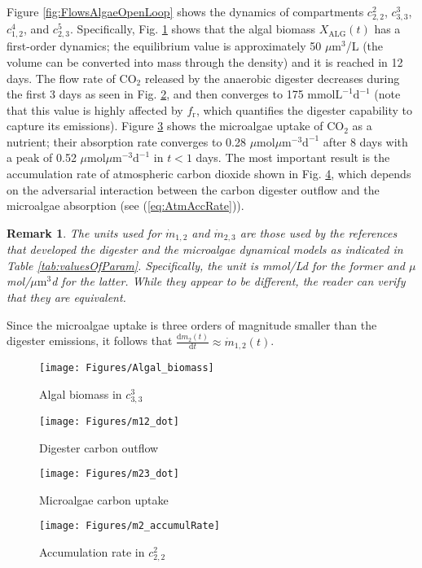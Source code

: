 \documentclass[lettersize,journal]{IEEEtran}
\newtheorem{remark}{Remark}
\begin{document}
Figure \ref{fig:FlowsAlgaeOpenLoop} shows the dynamics of compartments $c^2_{2,2}$, $c^3_{3,3}$, $c^4_{1,2}$, and $c^5_{2,3}$. Specifically, Fig. \ref{fig:Algal_biomass} shows that the algal biomass $X_{\text{ALG}}(t)$ has a first-order dynamics; the equilibrium value is approximately 50 $\mu \text{m}^3$/L (the volume can be converted into mass through the density) and it is reached in 12 days. The flow rate of $\text{CO}_2$ released by the anaerobic digester decreases during the first 3 days as seen in Fig. \ref{fig:m12_dot}, and then converges to 175 mmol$\text{L}^{-1}\text{d}^{-1}$ (note that this value is highly affected by $f_\text{r}$, which quantifies the digester capability to capture its emissions). Figure \ref{fig:m23_dot} shows the microalgae uptake of $\text{CO}_2$ as a nutrient; their absorption rate converges to 0.28 $\mu \text{mol} \mu \text{m}^{-3}\text{d}^{-1}$ after 8 days with a peak of 0.52 $\mu \text{mol} \mu \text{m}^{-3}\text{d}^{-1}$ in $t < 1$ days. The most important result is the accumulation rate of atmospheric carbon dioxide shown in Fig. \ref{fig:m2_accumulRate}, which depends on the adversarial interaction between the carbon digester outflow and the microalgae absorption (see (\ref{eq:AtmAccRate})). 
\begin{remark}
The units used for $\dot{m}_{1,2}$ and $\dot{m}_{2,3}$ are those used by the references that developed the digester and the microalgae dynamical models as indicated in Table \ref{tab:valuesOfParam}. Specifically, the unit is mmol/Ld for the former and $\mu$mol/$\mu \text{m}^3$d for the latter. While they appear to be different, the reader can verify that they are equivalent.   
\end{remark}
Since the microalgae uptake is three orders of magnitude smaller than the digester emissions, it follows that $\frac{\text{d}m_2(t)}{\text{d}t} \approx \dot{m}_{1,2}(t)$.          
\begin{figure*}[t]
\begin{subfigure}{.24\textwidth}
  \centering
  \texttt{[image: Figures/Algal\_biomass]}
  \caption{Algal biomass in $c^3_{3,3}$}
  \label{fig:Algal_biomass}
\end{subfigure}%
\begin{subfigure}{.24\textwidth}
  \centering
  \texttt{[image: Figures/m12\_dot]}
  \caption{Digester carbon outflow}
  \label{fig:m12_dot}
\end{subfigure} 
\begin{subfigure}{.24\textwidth}
  \centering
  \texttt{[image: Figures/m23\_dot]}
  \caption{Microalgae carbon uptake}
  \label{fig:m23_dot}
\end{subfigure}
\begin{subfigure}{.24\textwidth}
  \centering
  \texttt{[image: Figures/m2\_accumulRate]}
  \caption{Accumulation rate in $c^2_{2,2}$}
  \label{fig:m2_accumulRate}
\end{subfigure}
\caption{Dynamics of compartments $c^2_{2,2}$, $c^3_{3,3}$, $c^4_{1,2}$, and $c^5_{2,3}$ using the values in Table \ref{tab:valuesOfParam}.}
\label{fig:FlowsAlgaeOpenLoop}
\end{figure*}
\end{document}
